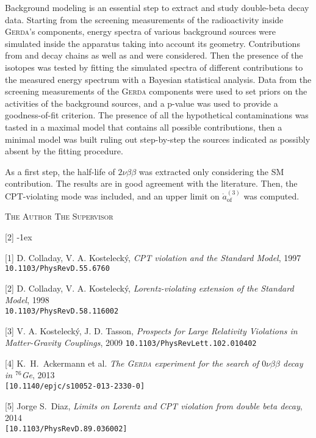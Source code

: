 \documentclass[11pt, a4paper]{article}
\newcommand{\aof}{\mathring{a}_\text{of}^{(3)}}
\begin{document}
Background modeling is an essential step to extract and study double-beta decay data. Starting from the screening measurements of the radioactivity inside \textsc{Gerda}'s components, energy spectra of various background sources were simulated inside the apparatus taking into account its geometry. Contributions from  and  decay chains as well as  and  were considered. Then the presence of the isotopes was tested by fitting the simulated spectra of different contributions to the measured energy spectrum with a Bayesian statistical analysis. Data from the screening measurements of the \textsc{Gerda} components were used to set priors on the activities of the background sources, and a p-value was used to provide a goodness-of-fit criterion. The presence of all the hypothetical contaminations was tasted in a maximal model that contains all possible contributions, then a minimal model was built ruling out step-by-step the sources indicated as possibly absent by the fitting procedure.

As a first step, the half-life of $2\nu\beta\beta$ was extracted only considering the SM contribution. The results are in good agreement with the literature. Then, the CPT-violating mode was included, and an upper limit on $\aof$ was computed.
\vspace{2cm}
\begin{multicols}{2}
\noindent
\textsc{The Author}
\columnbreak
\flushright
\textsc{The Supervisor}
\end{multicols}
\vspace*{\fill}
\begin{labeling}{{[2]}}
\footnotesize
\itemsep-1ex
	\item[{[1]}] D. Colladay, V. A. Kosteleck\'y, \emph{CPT violation and the Standard Model}, 1997\\\texttt{10.1103/PhysRevD.55.6760}
	\item[{[2]}] D. Colladay, V. A. Kosteleck\'y, \emph{Lorentz-violating extension of the Standard Model}, 1998\\\texttt{10.1103/PhysRevD.58.116002}
	\item[{[3]}] V. A. Kosteleck\'y, J. D. Tasson, \emph{Prospects for Large Relativity Violations in Matter-Gravity Couplings}, 2009 \texttt{10.1103/PhysRevLett.102.010402}
	\item[{[4]}] K.~H.~Ackermann et al. \emph{The \textsc{Gerda} experiment for the search of $0\nu\beta\beta$ decay in $^{76}$Ge}, 2013\\\texttt{[10.1140/epjc/s10052-013-2330-0]}
	\item[{[5]}] Jorge S.~Diaz, \emph{Limits on Lorentz and CPT violation from double beta decay}, 2014\\\texttt{[10.1103/PhysRevD.89.036002]}
\end{labeling}
\end{document}
